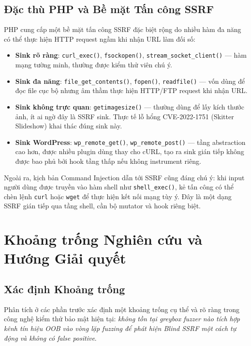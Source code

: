 \subsection{Đặc thù PHP và Bề mặt Tấn công SSRF}

PHP cung cấp một bề mặt tấn công SSRF đặc biệt rộng do nhiều hàm đa năng có thể
thực hiện HTTP request ngầm khi nhận URL làm đối số:

\begin{itemize}
    \item \textbf{Sink rõ ràng}: \texttt{curl\_exec()}, \texttt{fsockopen()},
    \texttt{stream\_socket\_client()} --- hàm mạng tường minh, thường được kiểm thử
    viên chú ý.
    \item \textbf{Sink đa năng}: \texttt{file\_get\_contents()}, \texttt{fopen()},
    \texttt{readfile()} --- vốn dùng để đọc file cục bộ nhưng âm thầm thực hiện
    HTTP/FTP request khi nhận URL.
    \item \textbf{Sink không trực quan}: \texttt{getimagesize()} --- thường dùng để
    lấy kích thước ảnh, ít ai ngờ đây là SSRF sink. Thực tế lỗ hổng
    CVE-2022-1751 (Skitter Slideshow) khai thác đúng sink này.
    \item \textbf{Sink WordPress}: \texttt{wp\_remote\_get()},
    \texttt{wp\_remote\_post()} --- tầng abstraction cao hơn, được nhiều plugin dùng
    thay cho cURL, tạo ra sink gián tiếp không được bao phủ bởi hook tầng thấp nếu
    không instrument riêng.
\end{itemize}

Ngoài ra, kịch bản Command Injection dẫn tới SSRF cũng đáng chú ý: khi input người
dùng được truyền vào hàm shell như \texttt{shell\_exec()}, kẻ tấn công có thể chèn
lệnh \texttt{curl} hoặc \texttt{wget} để thực hiện kết nối mạng tùy ý. Đây là một
dạng SSRF gián tiếp qua tầng shell, cần bộ mutator và hook riêng biệt.

\section{Khoảng trống Nghiên cứu và Hướng Giải quyết}
\label{sec:gap}

\subsection{Xác định Khoảng trống}

Phân tích ở các phần trước xác định một khoảng trống cụ thể và rõ ràng trong công
nghệ kiểm thử bảo mật hiện tại: \textit{không tồn tại greybox fuzzer nào tích hợp
kênh tín hiệu OOB vào vòng lặp fuzzing để phát hiện Blind SSRF một cách tự động và
không có false positive}.

